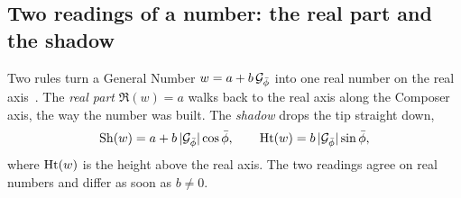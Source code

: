 \subsection{Two readings of a number: the real part and the shadow}\label{subsec:readings}

Two rules turn a General Number $w = a + b\,\mathcal{G}_{\bar{\phi}}$ into one real number on the real axis~\citep[Definitions~3.9 and~3.10]{DerrazGN2026}. The \emph{real part} $\Re(w) = a$ walks back to the real axis along the Composer axis, the way the number was built. The \emph{shadow} drops the tip straight down,
\begin{equation}\label{eq:shadow}
\operatorname{Sh}(w) = a + b\,\lvert\mathcal{G}_{\bar{\phi}}\rvert\cos\bar{\phi} , \qquad \operatorname{Ht}(w) = b\,\lvert\mathcal{G}_{\bar{\phi}}\rvert\sin\bar{\phi} ,
\end{equation}
where $\operatorname{Ht}(w)$ is the height above the real axis. The two readings agree on real numbers and differ as soon as $b \neq 0$.
